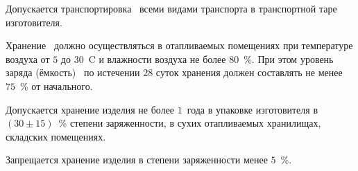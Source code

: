 \point
Допускается транспортировка \dut \ всеми видами транспорта в транспортной таре изготовителя.


\point
Хранение \dut \ должно осуществляться в отапливаемых помещениях при температуре воздуха от $5$ до $30$~\degree C и влажности воздуха не более $80$~\%. При этом уровень заряда (ёмкость) \dut \ по истечении $28$ суток хранения должен составлять не менее $75$~\% от начального.

\point
Допускается хранение изделия не более $1$~года в упаковке изготовителя в $(30 \pm 15)$~\% степени заряженности, в сухих отапливаемых хранилищах, складских помещениях.

\point
Запрещается хранение изделия в степени заряженности менее $5$~\%.

